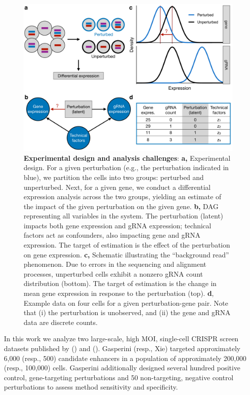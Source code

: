 \documentclass[12pt]{article}
\begin{document}
\begin{figure}[h!]
	\centering
	\includegraphics[width=1\linewidth]{../../figures/analysis_challenges/plot.pdf}
	\caption{\textbf{Experimental design and analysis challenges}: \textbf{a,} Experimental design. For a given perturbation (e.g., the perturbation indicated in blue), we partition the cells into two groups: perturbed and unperturbed. Next, for a given gene, we conduct a differential expression analysis across the two groups, yielding an estimate of the impact of the given perturbation on the given gene. \textbf{b,} DAG representing all variables in the system. The perturbation (latent) impacts both gene expression and gRNA expression; technical factors act as confounders, also impacting gene and gRNA expression. The target of estimation is the effect of the perturbation on gene expression. \textbf{c,} Schematic illustrating the ``background read'' phenomenon. Due to errors in the sequencing and alignment processes, unperturbed cells exhibit a nonzero gRNA count distribution (bottom). The target of estimation is the change in mean gene expression in response to the perturbation (top). \textbf{d}, Example data on four cells for a given perturbation-gene pair. Note that (i) the perturbation is unobserved, and (ii) the gene and gRNA data are discrete counts.}
	\label{analysis_challenges}
\end{figure}

In this work we analyze two large-scale, high MOI, single-cell CRISPR screen datasets published by (\cite{Gasperini2019}) and (\cite{Xie2019a}). Gasperini (resp., Xie) targeted approximately 6,000 (resp., 500) candidate enhancers in a population of approximately 200,000 (resp., 100,000) cells. Gasperini additionally designed several hundred positive control, gene-targeting perturbations and 50 non-targeting, negative control perturbations to assess method sensitivity and specificity.
\end{document}
